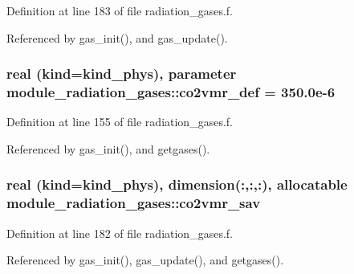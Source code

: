 Definition at line 183 of file radiation\+\_\+gases.\+f.



Referenced by gas\+\_\+init(), and gas\+\_\+update().

\subsubsection[{\texorpdfstring{co2vmr\+\_\+def}{co2vmr_def}}]{\setlength{\rightskip}{0pt plus 5cm}real (kind=kind\+\_\+phys), parameter module\+\_\+radiation\+\_\+gases\+::co2vmr\+\_\+def = 350.\+0e-\/6\hspace{0.3cm}{\ttfamily [private]}}\hypertarget{group__module__radiation__gases_ga4fb5ca2e3bfaed7848d7602a22499e76}{}\label{group__module__radiation__gases_ga4fb5ca2e3bfaed7848d7602a22499e76}


Definition at line 155 of file radiation\+\_\+gases.\+f.



Referenced by gas\+\_\+init(), and getgases().

\subsubsection[{\texorpdfstring{co2vmr\+\_\+sav}{co2vmr_sav}}]{\setlength{\rightskip}{0pt plus 5cm}real (kind=kind\+\_\+phys), dimension(\+:,\+:,\+:), allocatable module\+\_\+radiation\+\_\+gases\+::co2vmr\+\_\+sav\hspace{0.3cm}{\ttfamily [private]}}\hypertarget{group__module__radiation__gases_ga4f35e5db780a64963dc65b8449def39d}{}\label{group__module__radiation__gases_ga4f35e5db780a64963dc65b8449def39d}


Definition at line 182 of file radiation\+\_\+gases.\+f.



Referenced by gas\+\_\+init(), gas\+\_\+update(), and getgases().

